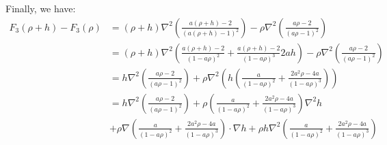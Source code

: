 \documentclass[11pt, a4paper]{article}
\theoremstyle{definition}
\begin{document}
Finally, we have:
\begin{align*}
	F_3(\rho+h) - F_3(\rho) &= (\rho +h) \nabla^2 \left(\frac{a(\rho +h) -2}{(a(\rho +h) -1)^2}\right) -\rho \nabla^2 \left(\frac{a\rho -2}{(a\rho -1)^2}\right)\\
	&=  (\rho +h) \nabla^2 \left(\frac{a(\rho +h) -2}{(1-a\rho)^2} + \frac{a(\rho +h) -2}{(1-a\rho)^3}2ah \right) -\rho \nabla^2 \left(\frac{a\rho -2}{(a\rho -1)^2}\right)\\
	&= h \nabla^2 \left(\frac{a\rho -2}{(a\rho -1)^2}\right) + \rho \nabla^2  \left(h\left(\frac{a }{(1-a\rho)^2} + \frac{2a^2\rho -4a}{(1-a\rho)^3} \right)\right)\\
	&= h \nabla^2 \left(\frac{a\rho -2}{(a\rho -1)^2}\right) + \rho  \left(\frac{a }{(1-a\rho)^2} + \frac{2a^2\rho -4a}{(1-a\rho)^3} \right)\nabla^2 h \\
	&+ \rho \nabla \left(\frac{a }{(1-a\rho)^2} + \frac{2a^2\rho -4a}{(1-a\rho)^3} \right) \cdot \nabla h + \rho h \nabla^2  \left(\frac{a }{(1-a\rho)^2} + \frac{2a^2\rho -4a}{(1-a\rho)^3} \right)\\
\end{align*}
\end{document}
